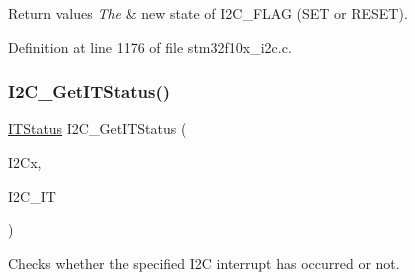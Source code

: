 \begin{DoxyRetVals}{Return values}
{\em The} & new state of I2\+C\+\_\+\+F\+L\+AG (S\+ET or R\+E\+S\+ET). \\
\hline
\end{DoxyRetVals}


Definition at line 1176 of file stm32f10x\+\_\+i2c.\+c.

\mbox{\label{group___i2_c___exported___functions_ga447771fbbd94a56f3570b9f430a069ba}} 
\subsubsection{\texorpdfstring{I2\+C\+\_\+\+Get\+I\+T\+Status()}{I2C\_GetITStatus()}}
{\footnotesize\ttfamily \hyperlink{group___exported__types_gaacbd7ed539db0aacd973a0f6eca34074}{I\+T\+Status} I2\+C\+\_\+\+Get\+I\+T\+Status (\begin{DoxyParamCaption}\item[{\hyperlink{struct_i2_c___type_def}{I2\+C\+\_\+\+Type\+Def} $\ast$}]{I2\+Cx,  }\item[{uint32\+\_\+t}]{I2\+C\+\_\+\+IT }\end{DoxyParamCaption})}



Checks whether the specified I2C interrupt has occurred or not. 


